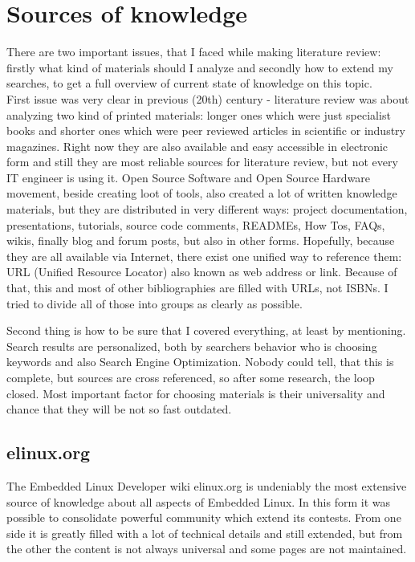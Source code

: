 \documentclass[printmode]{mgr}
\begin{document}
\section{Sources of knowledge}
\label{section:sources-of-knowledge}

There are two important issues, that I faced while making literature review: firstly what kind of materials should I analyze and secondly how to extend my searches, to get a full overview of current state of knowledge on this topic.  \\

First issue was very clear in previous (20th) century - literature review was about analyzing two kind of printed materials: longer ones which were just specialist books and shorter ones which were peer reviewed articles in scientific or industry magazines.
Right now they are also available and easy accessible in electronic form and still they are most reliable sources for literature review, but not every IT engineer is using it.
Open Source Software and Open Source Hardware movement, beside creating loot of tools, also created a lot of written knowledge materials, but they are distributed in very different ways: project documentation, presentations, tutorials, source code comments, READMEs, How Tos, FAQs, wikis, finally blog and forum posts, but also in other forms.
Hopefully, because they are all available via Internet, there exist one unified way to reference them: URL (Unified Resource Locator) also known as web address or link. Because of that, this and most of other bibliographies are filled with URLs, not ISBNs. I tried to divide all of those into groups as clearly as possible.

Second thing is how to be sure that I covered everything, at least by mentioning. Search results are personalized, both by searchers behavior who is choosing keywords and also Search Engine Optimization. Nobody could tell, that this is complete, but sources are cross referenced, so after some research, the loop closed. Most important factor for choosing materials is their universality and chance that they will be not so fast outdated.

\subsection{elinux.org}

The Embedded Linux Developer wiki elinux.org is undeniably the most extensive source of knowledge about all aspects of Embedded Linux.
In this form it was possible to consolidate powerful community which extend its contests.
From one side it is greatly filled with a lot of technical details and still extended, but from the other the content is not always universal and some pages are not maintained.\\
\end{document}
